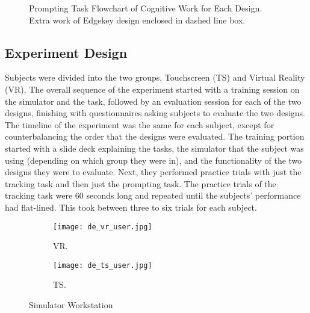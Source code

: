 \begin{figure}
    \medskip
    \caption{Prompting Task Flowchart of Cognitive Work for Each Design. Extra work of Edgekey design enclosed in dashed line box.}
    \label{fig:de_flowchart}
\end{figure}

\subsection{Experiment Design}

Subjects were divided into the two groups, Touchscreen (TS) and Virtual Reality (VR).
The overall sequence of the experiment started with a training session on the simulator and the task, followed by an evaluation session for each of the two designs, finishing with questionnaires asking subjects to evaluate the two designs.
The timeline of the experiment was the same for each subject, except for counterbalancing the order that the designs were evaluated.
The training portion started with a slide deck explaining the tasks, the simulator that the subject was using (depending on which group they were in), and the functionality of the two designs they were to evaluate.
Next, they performed practice trials with just the tracking task and then just the prompting task.
The practice trials of the tracking task were 60 seconds long and repeated until the subjects' performance had flat-lined.
This took between three to six trials for each subject.

\begin{figure}
    \centering
    \begin{subfigure}[t]{0.49\linewidth}
        \centering
        \texttt{[image: de\_vr\_user.jpg]}
        \caption{VR.}
        \label{fig:de_userpic:vr}
    \end{subfigure}
    \begin{subfigure}[t]{0.49\linewidth}
        \centering
        \texttt{[image: de\_ts\_user.jpg]}
        \caption{TS.}
        \label{fig:de_userpic:ts}
    \end{subfigure}
    \caption{Simulator Workstation}
    \label{fig:de_userpic}
\end{figure}

